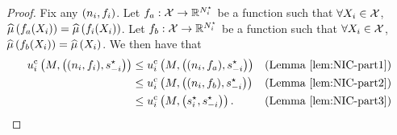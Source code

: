 \begin{proof}
    Fix any $(n_i,f_i)$. Let $f_a:\mathcal{X}\rightarrow\mathbb{R}^{N^\star_i}$ be a function such that $\forall X_{i}\in\mathcal{X}$, $\widehat{\mu}\left(f_a(X_{i})\right)=\widehat{\mu}\left(f_i(X_{i})\right)$. Let $f_b:\mathcal{X}\rightarrow\mathbb{R}^{N^\star_i}$ be a function such that $\forall X_{i}\in\mathcal{X}$, $\widehat{\mu}\left(f_b(X_{i})\right)=\widehat{\mu}\left(X_{i}\right)$.
    We then have that
    \begin{align*}
        \utilci \rbr{M, \rbr{(\nni,\subfunci),\strat_{-i}^{\star} }}
        &\leq
        \utilci \rbr{M, \rbr{(\nni,f_a),\strat_{-i}^{\star} }}
        &
        (\text{Lemma}~\ref{lem:NIC-part1})
        \\
        &\leq
        \utilci \rbr{M, \rbr{(\nni,f_b),\strat_{-i}^{\star} }}
        &
        (\text{Lemma}~\ref{lem:NIC-part2})
        \\
        &\leq
        \utilci \rbr{M, \rbr{\strat_{i}^{\star},\strat_{-i}^{\star} }} .
        &
        \hspace{-1cm}
        (\text{Lemma}~\ref{lem:NIC-part3})
    \end{align*}
\end{proof}

